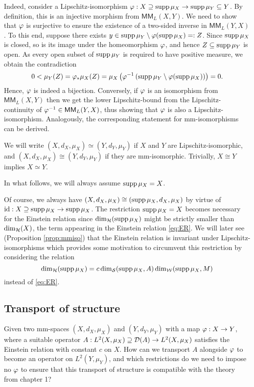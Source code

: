 Indeed, consider a Lipschitz-isomorphism $\varphi:X\supseteq\operatorname{supp}\mu_X\to\operatorname{supp}\mu_Y\subseteq Y$. By definition, this is an injective morphism from $\mathsf{MM}_L(X,Y)$. We need to show that $\varphi$ is surjective to ensure the existence of a two-sided inverse in $\mathsf{MM}_L(Y,X)$. To this end, suppose there exists $y\in\operatorname{supp}\mu_Y\setminus \varphi(\operatorname{supp}\mu_X)=:Z$. Since $\operatorname{supp}\mu_X$ is closed, so is its image under the homeomorphism $\varphi$, and hence $Z\subseteq \operatorname{supp}\mu_Y$ is open. As every open subset of $\operatorname{supp}\mu_Y$ is required to have positive measure, we obtain the contradiction
\[
  0<\mu_Y(Z)=\varphi_*\mu_X(Z)=\mu_X\left(\varphi^{-1}\left(\operatorname{supp}\mu_Y\setminus \varphi(\operatorname{supp}\mu_X)\right)\right)=0.
\]
Hence, $\varphi$ is indeed a bijection. Conversely, if $\varphi$ is an isomorphism from $\mathsf{MM}_L(X,Y)$ then we get the lower Lipschitz-bound from the Lipschitz-continuity of $\varphi^{-1}\in\mathsf{MM}_L(Y,X)$, thus showing that $\varphi$ is also a Lipschitz-isomorphism. Analogously, the corresponding statement for mm-isomorphisms can be derived.

We will write $(X,d_X,\mu_X)\simeq (Y,d_Y,\mu_Y)$ if $X$ and $Y$ are Lipschitz-isomorphic, and 
$(X,d_X,\mu_X)\cong (Y,d_Y,\mu_Y)$ if they are mm-isomorphic. Trivially, $X\cong Y$ implies $X\simeq Y$. 

In what follows, we will always assume $\operatorname{supp}\mu_X=X$.
\begin{rem}
  Of course, we always have $(X,d_X,\mu_X)\cong(\operatorname{supp}\mu_X,d_X,\mu_X)$ by virtue of 
  $\operatorname{id}:X\supseteq\operatorname{supp}\mu_X \to\operatorname{supp}\mu_X$. The restriction $\operatorname{supp}\mu_X=X$ becomes necessary for the Einstein relation since $\dim_{\mathcal{H}}(\operatorname{supp}\mu_X)$ might be strictly smaller than $\dim_{\mathcal{H}}(X)$, the term appearing in the Einstein relation \eqref{eq:ER}. We will later see (Proposition \ref{prop:mmiso}) that the Einstein relation is invariant under Lipschitz-isomorphisms which provides some motivation to circumvent this restriction by considering the relation
  \[
    \dim_{\mathcal{H}}(\operatorname{supp}\mu_X)=c\dim_{\mathcal{S}}(\operatorname{supp}\mu_X,A)\dim_{\mathcal{W}}(\operatorname{supp}\mu_X,M)
  \]
  instead of \eqref{eq:ER}.
\end{rem}

\subsection{Transport of structure}

Given two mm-spaces $(X,d_X,\mu_X)$ and $(Y,d_Y,\mu_Y)$ with a map $\varphi:X\to Y$, where a suitable operator 
$A:L^2(X,\mu_X)\supseteq\mathcal{D}(A)\to L^2(X,\mu_X)$ satisfies the Einstein relation with constant $c$ on $X$. How can we transport $A$ alongside $\varphi$ to become an operator on $L^2(Y,\mu_Y)$, and which restrictions do we need to impose no $\varphi$ to ensure that this transport of structure is compatible with the theory from chapter 1?

